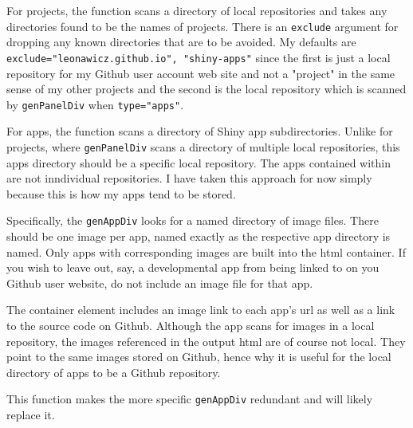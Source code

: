 \documentclass{article}\usepackage[]{graphicx}\usepackage[]{color}
\begin{document}
For projects, the function scans a directory of local repositories and takes any directories found to be the names of projects.
There is an \texttt{exclude} argument for dropping any known directories that are to be avoided.
My defaults are \texttt{exclude="leonawicz.github.io", "shiny-apps"} since the first is just a local repository for my Github user account web site and not a "project" in the same sense of my other projects
and the second is the local repository which is scanned by \texttt{genPanelDiv} when \texttt{type="apps"}.

For apps, the function scans a directory of Shiny app subdirectories.
Unlike for projects, where \texttt{genPanelDiv} scans a directory of multiple local repositories, this apps directory should be a specific local repository. The apps contained within are not inndividual repositories.
I have taken this approach for now simply because this is how my apps tend to be stored.

Specifically, the \texttt{genAppDiv} looks for a named directory of image files.
There should be one image per app, named exactly as the respective app directory is named.
Only apps with corresponding images are built into the html container.
If you wish to leave out, say, a developmental app from being linked to on you Github user website, do not include an image file for that app.

The container element includes an image link to each app's url as well as a link to the source code on Github.
Although the app scans for images in a local repository, the images referenced in the output html are of course not local.
They point to the same images stored on Github, hence why it is useful for the local directory of apps to be a Github repository.

This function makes the more specific \texttt{genAppDiv} redundant and will likely replace it.
\end{document}
